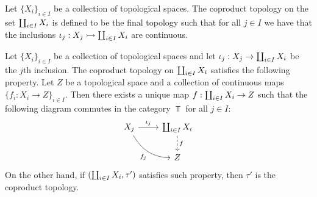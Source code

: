 \begin{definition}\label{def: coproduct top}
    Let \(\{X_i\}_{i \in I}\) be a collection of topological spaces. The coproduct
    topology on the set \(\coprod_{i \in I} X_i\) is defined to be the final
    topology such that for all \(j \in I\) we have that the inclusions \(\iota_j:
    X_j \rightarrowtail \coprod_{i \in I} X_i\) are continuous.
\end{definition}

\begin{theorem}
    \label{thm: coprod top universal property}
    Let \(\{X_i\}_{i \in I}\) be a collection of topological spaces and let
    \(\iota_j: X_j \to \coprod_{i \in I} X_i\) be the \(j\)th inclusion. The
    coproduct topology on \(\coprod_{i \in I} X_i\) satisfies the following
    property. Let \(Z\) be a topological space and a collection of continuous maps
    \(\{f_i: X_i \to Z\}_{i \in I}\). Then there exists a unique map \(f:
    \coprod_{i \in I} X_i \to Z\) such that the following diagram commutes in the
    category \(\Top\) for all \(j \in I\):
    \[
        \begin{tikzcd}
            X_j \ar[r, "\iota_j"]  \ar[rd, swap, bend right, "f_j"]
            & \bigatt_{i \in I} X_i \ar[d, dashed, "f"] \\ &Z
        \end{tikzcd}
    \]
    On the other hand, if \((\coprod_{i \in I} X_i, \tau')\) satisfies such
    property, then \(\tau'\) is the coproduct topology.
\end{theorem}

